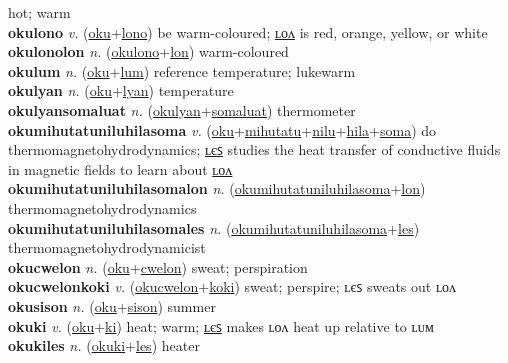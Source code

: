 hot; warm \label{okulon} \\
\textbf{okulono} \textit{v.} (\hyperref[oku]{oku}+\hyperref[lono]{lono})
be warm-coloured; \hyperref[okulonolon]{ʟᴏᴧ} is red, orange, yellow, or white \label{okulono} \\
\textbf{okulonolon} \textit{n.} (\hyperref[okulono]{okulono}+\hyperref[lon]{lon})
warm-coloured \label{okulonolon} \\
\textbf{okulum} \textit{n.} (\hyperref[oku]{oku}+\hyperref[lum]{lum})
reference temperature; lukewarm \label{okulum} \\
\textbf{okulyan} \textit{n.} (\hyperref[oku]{oku}+\hyperref[lyan]{lyan})
temperature \label{okulyan} \\
\textbf{okulyansomaluat} \textit{n.} (\hyperref[okulyan]{okulyan}+\hyperref[somaluat]{somaluat})
thermometer \label{okulyansomaluat} \\
\textbf{okumihutatuniluhilasoma} \textit{v.} (\hyperref[oku]{oku}+\hyperref[mihutatu]{mihutatu}+\hyperref[nilu]{nilu}+\hyperref[hila]{hila}+\hyperref[soma]{soma})
do thermomagnetohydrodynamics; \hyperref[okumihutatuniluhilasomales]{ʟєꜱ} studies the heat transfer of conductive fluids in magnetic fields to learn about \hyperref[okumihutatuniluhilasomalon]{ʟᴏᴧ} \label{okumihutatuniluhilasoma} \\
\textbf{okumihutatuniluhilasomalon} \textit{n.} (\hyperref[okumihutatuniluhilasoma]{okumihutatuniluhilasoma}+\hyperref[lon]{lon})
thermomagnetohydrodynamics \label{okumihutatuniluhilasomalon} \\
\textbf{okumihutatuniluhilasomales} \textit{n.} (\hyperref[okumihutatuniluhilasoma]{okumihutatuniluhilasoma}+\hyperref[les]{les})
thermomagnetohydrodynamicist \label{okumihutatuniluhilasomales} \\
\textbf{okucwelon} \textit{n.} (\hyperref[oku]{oku}+\hyperref[cwelon]{cwelon})
sweat; perspiration \label{okucwelon} \\
\textbf{okucwelonkoki} \textit{v.} (\hyperref[okucwelon]{okucwelon}+\hyperref[koki]{koki})
sweat; perspire; ʟєꜱ sweats out ʟᴏᴧ \label{okucwelonkoki} \\
\textbf{okusison} \textit{n.} (\hyperref[oku]{oku}+\hyperref[sison]{sison})
summer \label{okusison} \\
\textbf{okuki} \textit{v.} (\hyperref[oku]{oku}+\hyperref[ki]{ki})
heat; warm; \hyperref[okukiles]{ʟєꜱ} makes ʟᴏᴧ heat up relative to ʟᴜᴍ \label{okuki} \\
\textbf{okukiles} \textit{n.} (\hyperref[okuki]{okuki}+\hyperref[les]{les})
heater \label{okukiles} \\
